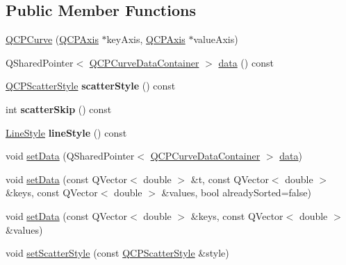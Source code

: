 \subsection*{Public Member Functions}
\begin{DoxyCompactItemize}
\item 
\mbox{\hyperlink{class_q_c_p_curve_a36de58e2652b3fa47bdf9187d421d3ce}{Q\+C\+P\+Curve}} (\mbox{\hyperlink{class_q_c_p_axis}{Q\+C\+P\+Axis}} $\ast$key\+Axis, \mbox{\hyperlink{class_q_c_p_axis}{Q\+C\+P\+Axis}} $\ast$value\+Axis)
\item 
Q\+Shared\+Pointer$<$ \mbox{\hyperlink{class_q_c_p_data_container}{Q\+C\+P\+Curve\+Data\+Container}} $>$ \mbox{\hyperlink{class_q_c_p_curve_a761492fd00b1ab7cb18ce23c118c6c60}{data}} () const
\item 
\mbox{\label{class_q_c_p_curve_afa6bd72a3a331a5ed45d3e0c5843b592}} 
\mbox{\hyperlink{class_q_c_p_scatter_style}{Q\+C\+P\+Scatter\+Style}} {\bfseries scatter\+Style} () const
\item 
\mbox{\label{class_q_c_p_curve_a09b33217172aedf6c62c441b4ff66166}} 
int {\bfseries scatter\+Skip} () const
\item 
\mbox{\label{class_q_c_p_curve_a06e3cf3f8f1add689254b3cda66e040e}} 
\mbox{\hyperlink{class_q_c_p_curve_a2710e9f79302152cff794c6e16cc01f1}{Line\+Style}} {\bfseries line\+Style} () const
\item 
void \mbox{\hyperlink{class_q_c_p_curve_a41246850d2e080bc57183ca19cd4135e}{set\+Data}} (Q\+Shared\+Pointer$<$ \mbox{\hyperlink{class_q_c_p_data_container}{Q\+C\+P\+Curve\+Data\+Container}} $>$ \mbox{\hyperlink{class_q_c_p_curve_a761492fd00b1ab7cb18ce23c118c6c60}{data}})
\item 
void \mbox{\hyperlink{class_q_c_p_curve_a0768af2c33c8dcffa3cf5bdeb53923a6}{set\+Data}} (const Q\+Vector$<$ double $>$ \&t, const Q\+Vector$<$ double $>$ \&keys, const Q\+Vector$<$ double $>$ \&values, bool already\+Sorted=false)
\item 
void \mbox{\hyperlink{class_q_c_p_curve_a9d3245d43304226e013240c94802f7f6}{set\+Data}} (const Q\+Vector$<$ double $>$ \&keys, const Q\+Vector$<$ double $>$ \&values)
\item 
void \mbox{\hyperlink{class_q_c_p_curve_a55e43b44709bf50a35500644988aa706}{set\+Scatter\+Style}} (const \mbox{\hyperlink{class_q_c_p_scatter_style}{Q\+C\+P\+Scatter\+Style}} \&style)

\end{DoxyCompactItemize}

